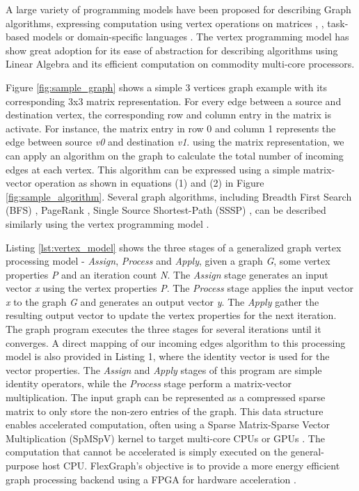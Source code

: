A large variety of programming models have been proposed for describing Graph algorithms, expressing computation using vertex operations on matrices \cite{GraphMat} \cite{GraphLab}, \cite{Pregel}, \cite{MapGraph} \cite{GraphX} task-based models \cite{Galois} or domain-specific languages \cite{GreenMarl}. The vertex programming model has show great adoption for its ease of abstraction for describing algorithms using Linear Algebra and its efficient computation on commodity multi-core processors.

Figure \ref{fig:sample_graph} shows a simple 3 vertices graph example with its corresponding 3x3 matrix representation. For every edge between a source and destination vertex, the corresponding row and column entry in the matrix is activate. For instance, the matrix entry in row 0 and column 1 represents the edge between source \textit{v0} and destination \textit{v1}. using the matrix representation, we can apply an algorithm on the graph to calculate the total number of incoming edges at each vertex. This algorithm can be expressed using a simple matrix-vector operation as shown in equations (1) and (2) in Figure \ref{fig:sample_algorithm}. Several graph algorithms, including Breadth First Search (BFS) \cite{BFS}, PageRank \cite{PageRank}, Single Source Shortest-Path (SSSP) \cite{SSSP}, can be described similarly using the vertex programming model \cite{GraphMat}.

Listing \ref{lst:vertex_model} shows the three stages of a generalized graph vertex processing model - \textit{Assign}, \textit{Process} and \textit{Apply}, given a graph \textit{G}, some vertex properties \textit{P} and an iteration count \textit{N}. The \textit{Assign} stage generates an input vector \textit{x} using the vertex properties \textit{P}. The \textit{Process} stage applies the input vector \textit{x} to the graph \textit{G} and generates an output vector \textit{y}. The\textit{ Apply} gather the resulting output vector to update the vertex properties for the next iteration. The graph program executes the three stages for several iterations until it converges. A direct mapping of our incoming edges algorithm to this processing model is also provided in Listing 1, where the identity vector is used for the vector properties. The \textit{Assign} and \textit{Apply} stages of this program are simple identity operators, while the \textit{Process} stage perform a matrix-vector multiplication. The input graph can be represented as a compressed sparse matrix to only store the non-zero entries of the graph. This data structure enables accelerated computation, often using a Sparse Matrix-Sparse Vector Multiplication (SpMSpV) kernel to target multi-core CPUs \cite{GraphMat} or GPUs \cite{MapGraph}. The computation that cannot be accelerated is simply executed on the general-purpose host CPU. FlexGraph's objective is to provide a more energy efficient graph processing backend using a FPGA for hardware acceleration \cite{Catapult}.

